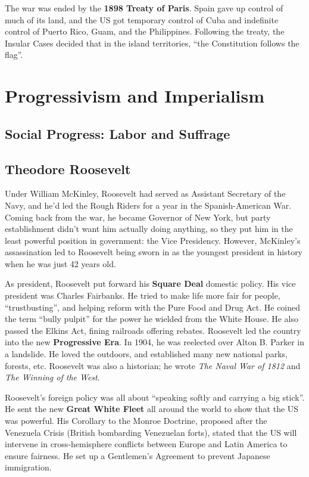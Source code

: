 The war was ended by the \textbf{1898 Treaty of Paris}.
Spain gave up control of much of its land,
and the US got temporary control of Cuba and indefinite control of Puerto Rico, Guam, and the Philippines.
Following the treaty, the Insular Cases decided that in the island territories, ``the Constitution follows the flag''.

\section{Progressivism and Imperialism}

\subsection*{Social Progress: Labor and Suffrage}

\subsection*{Theodore Roosevelt}

Under William McKinley, Roosevelt had served as Assistant Secretary of the Navy,
and he'd led the Rough Riders for a year in the Spanish-American War.
Coming back from the war, he became Governor of New York,
but party establishment didn't want him actually doing anything,
so they put him in the least powerful position in government: the Vice Presidency.
However, McKinley's assassination led to Roosevelt being sworn in as the youngest president in history
when he was just 42 years old.

As president, Roosevelt put forward his \textbf{Square Deal} domestic policy.
His vice president was Charles Fairbanks.
He tried to make life more fair for people, ``trustbusting'',
and helping reform with the Pure Food and Drug Act.
He coined the term ``bully pulpit'' for the power he wielded from the White House.
He also passed the Elkins Act, fining railroads offering rebates.
Roosevelt led the country into the new \textbf{Progressive Era}.
In 1904, he was reelected over Alton B. Parker in a landslide.
He loved the outdoors, and established many new national parks, forests, etc.
Roosevelt was also a historian; he wrote \textit{The Naval War of 1812} and \textit{The Winning of the West}.

Roosevelt's foreign policy was all about ``speaking softly and carrying a big stick''.
He sent the new \textbf{Great White Fleet} all around the world to show that the US was powerful.
His Corollary to the Monroe Doctrine, proposed after the Venezuela Crisis (British bombarding Venezuelan forts),
stated that the US will intervene in cross-hemisphere conflicts between Europe and Latin America to ensure fairness.
He set up a Gentlemen's Agreement to prevent Japanese immigration.

